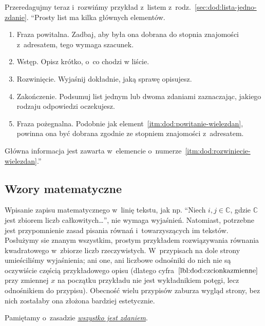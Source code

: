 Przeredagujmy teraz i~rozwińmy przykład z~listem z~rodz.~\ref{sec:dod:lista-jedno-zdanie}.
``Prosty list ma kilka głównych elementów.
\begin{enumerate}
  \item Fraza powitalna. Zadbaj, aby była ona dobrana do stopnia znajomości z~adresatem, tego wymaga szacunek. \label{itm:dod:powitanie-wielezdan} 
  \item Wstęp. Opisz krótko, o~co chodzi w liście.
  \item Rozwinięcie. \label{itm:dod:rozwiniecie-wielezdan} Wyjaśnij dokładnie, jaką sprawę opisujesz.  
  \item Zakończenie. Podsumuj list jednym lub dwoma zdaniami zaznaczając, jakiego rodzaju odpowiedzi oczekujesz. 
  \item Fraza pożegnalna. Podobnie jak element~\ref{itm:dod:powitanie-wielezdan}, powinna ona być dobrana zgodnie ze stopniem znajomości z~adresatem.
\end{enumerate}
Główna informacja jest zawarta w~elemencie o~numerze~\ref{itm:dod:rozwiniecie-wielezdan}.''


\subsection{Wzory matematyczne}
\label{sec:dod:wzorymat}

Wpisanie zapisu matematycznego w~linię tekstu, jak np. ``Niech $i,j\in\mathbb{C}$, gdzie $\mathbb{C}$ jest zbiorem liczb całkowitych\dots'', nie wymaga wyjaśnień. Natomiast, potrzebne jest przypomnienie zasad pisania równań i~towarzyszących im tekstów. Posłużymy sie znanym wszystkim, prostym przykładem rozwiązywania równania kwadratowego w~zbiorze liczb rzeczywistych. W~przypisach na dole strony umieściliśmy wyjaśnienia; ani one, ani liczbowe odnośniki do nich nie są oczywiście częścią przykładowego opisu (dlatego cyfra~$\ref{lbl:dod:czcionkazmienne}$ przy zmiennej $x$ na początku przykładu nie jest wykładnikiem potęgi, lecz odnośnikiem do przypisu). Obecność wielu przypisów zaburza wygląd strony, bez nich zostałaby ona złożona bardziej estetycznie.

Pamiętamy o~zasadzie \hyperref[sec:dod:zdaniem]{\em wszystko jest zdaniem}.

